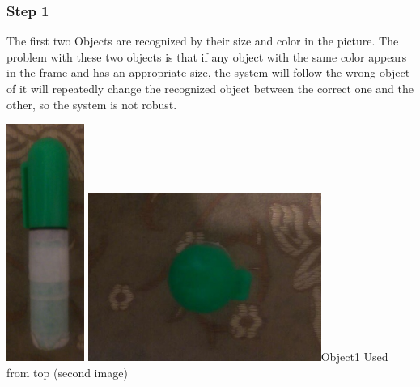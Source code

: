 \documentclass{report}
\begin{document}
\subsubsection{Step 1}
The first two Objects are recognized by their size and color in the picture. The problem with these two objects is that if any object with the same color appears in the frame and has an appropriate size, the system will follow the wrong object of it will repeatedly change the recognized object between the correct one and the other, so the system is not robust. \newline
\begin{center}
\includegraphics[width=1in]{Object1.jpg}
\includegraphics[width=3in]{Object1-2.jpg}\newline \figurename{Object1} Used from top (second image)	
\end{center}
\end{document}
